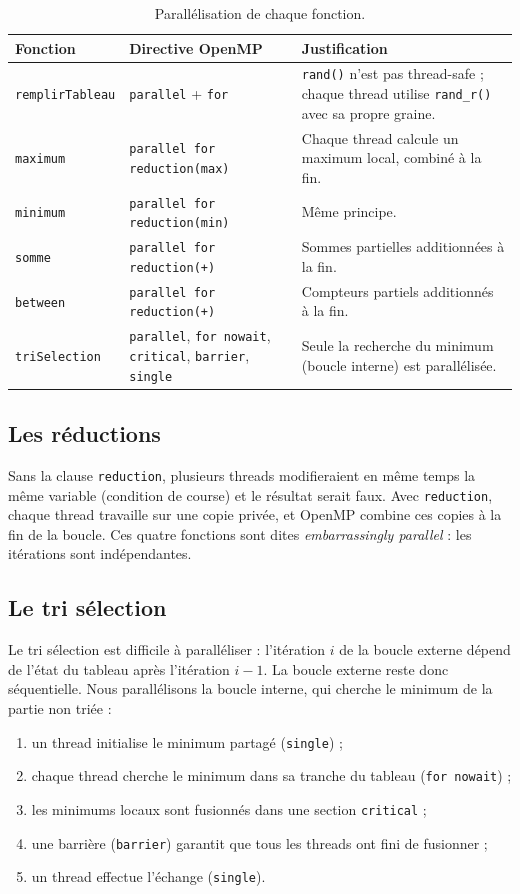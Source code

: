 \documentclass[11pt,a4paper]{article}
\begin{document}
\begin{table}[H]
\centering
\small
\begin{tabular}{p{3.2cm}p{4.3cm}p{6.5cm}}
\toprule
Fonction & Directive OpenMP & Justification \\
\midrule
\texttt{remplirTableau} & \texttt{parallel} + \texttt{for} & \texttt{rand()} n'est pas thread-safe ; chaque thread utilise \texttt{rand\_r()} avec sa propre graine. \\
\texttt{maximum} & \texttt{parallel for reduction(max)} & Chaque thread calcule un maximum local, combiné à la fin. \\
\texttt{minimum} & \texttt{parallel for reduction(min)} & Même principe. \\
\texttt{somme} & \texttt{parallel for reduction(+)} & Sommes partielles additionnées à la fin. \\
\texttt{between} & \texttt{parallel for reduction(+)} & Compteurs partiels additionnés à la fin. \\
\texttt{triSelection} & \texttt{parallel}, \texttt{for nowait}, \texttt{critical}, \texttt{barrier}, \texttt{single} & Seule la recherche du minimum (boucle interne) est parallélisée. \\
\bottomrule
\end{tabular}
\caption{Parallélisation de chaque fonction.}
\end{table}

\subsection{Les réductions}

Sans la clause \texttt{reduction}, plusieurs threads modifieraient en même temps la même variable (condition de course) et le résultat serait faux. Avec \texttt{reduction}, chaque thread travaille sur une copie privée, et OpenMP combine ces copies à la fin de la boucle. Ces quatre fonctions sont dites \emph{embarrassingly parallel} : les itérations sont indépendantes.

\subsection{Le tri sélection}

Le tri sélection est difficile à paralléliser : l'itération $i$ de la boucle externe dépend de l'état du tableau après l'itération $i-1$. La boucle externe reste donc séquentielle. Nous parallélisons la boucle interne, qui cherche le minimum de la partie non triée :
\begin{enumerate}
  \item un thread initialise le minimum partagé (\texttt{single}) ;
  \item chaque thread cherche le minimum dans sa tranche du tableau (\texttt{for nowait}) ;
  \item les minimums locaux sont fusionnés dans une section \texttt{critical} ;
  \item une barrière (\texttt{barrier}) garantit que tous les threads ont fini de fusionner ;
  \item un thread effectue l'échange (\texttt{single}).
\end{enumerate}
\end{document}
